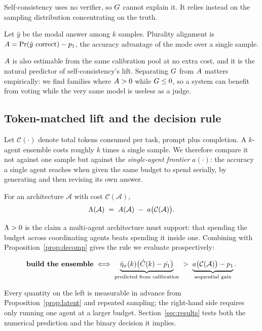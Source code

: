 Self-consistency uses no verifier, so $G$ cannot explain it. It relies
instead on the sampling distribution concentrating on the truth.

\begin{definition}
Let $\hat{y}$ be the modal answer among $k$ samples. Plurality alignment is
$A = \Pr(\hat{y} \text{ correct}) - p_1$, the accuracy advantage of the
mode over a single sample.
\end{definition}

$A$ is also estimable from the same calibration pool at no extra cost, and
it is the natural predictor of self-consistency's lift. Separating $G$ from
$A$ matters empirically: we find families where $A > 0$ while $G
\le 0$, so a system can benefit from voting while the very same model is
useless as a judge.

\subsection{Token-matched lift and the decision rule}
\label{sec:matched}

Let $\mathcal{C}(\cdot)$ denote total tokens consumed per task, prompt plus
completion. A $k$-agent ensemble costs roughly $k$ times a single sample. We
therefore compare it not against one sample but against the \emph{single-agent
frontier} $a(\cdot)$: the accuracy a single agent reaches when given the same
budget to spend serially, by generating and then revising its own answer.

\begin{definition}
For an architecture $\mathcal{A}$ with cost $\mathcal{C}(\mathcal{A})$,
\begin{equation}
\Lambda(\mathcal{A}) \;=\; A(\mathcal{A}) \;-\; a\bigl(\mathcal{C}(\mathcal{A})\bigr).
\end{equation}
\end{definition}

$\Lambda > 0$ is the claim a multi-agent architecture must support: that spending
the budget across coordinating agents beats spending it inside one. Combining
with Proposition~\ref{prop:decomp} gives the rule we evaluate prospectively:

\begin{equation}
\textbf{build the ensemble} \iff
\underbrace{\hat{\eta}_\sigma(k)\bigl(\hat{C}(k) - \hat{p_1}\bigr)}_{\text{predicted from calibration}}
\;>\;
\underbrace{a\bigl(\mathcal{C}(\mathcal{A})\bigr) - p_1}_{\text{sequential gain}} .
\label{eq:rule}
\end{equation}

Every quantity on the left is measurable in advance from
Proposition~\ref{prop:latent} and repeated sampling; the right-hand side
requires only running one agent at a larger budget. Section~\ref{sec:results}
tests both the numerical prediction and the binary decision it implies.
